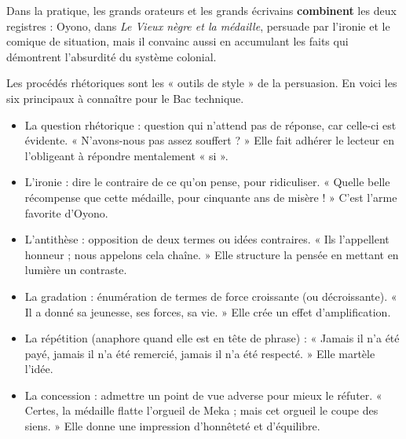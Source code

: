 \documentclass[11pt]{article}
\newcommand{\cle}[1]{{\popxbold\color{popdark}#1}}
\newcounter{popsec}
\newcounter{popsub}
\newcommand{\courssub}[1]{%
  \stepcounter{popsub}%
  \par\vspace{9pt}\noindent{\popxbold\fontsize{11.5}{13}\selectfont\color{popink}{\color{poporange}\thepopsec.\thepopsub}\hspace{6pt}#1}\par\nopagebreak\vspace{4pt}
}
\begin{document}
Dans la pratique, les grands orateurs et les grands écrivains \textbf{combinent} les deux registres : Oyono, dans \emph{Le Vieux nègre et la médaille}, persuade par l'ironie et le comique de situation, mais il convainc aussi en accumulant les faits qui démontrent l'absurdité du système colonial.

\courssub{Les procédés rhétoriques}

Les procédés rhétoriques sont les « outils de style » de la persuasion. En voici les six principaux à connaître pour le Bac technique.

\begin{definition}
\begin{itemize}
\item La \cle{question rhétorique} : question qui n'attend pas de réponse, car celle-ci est évidente. « N'avons-nous pas assez souffert ? » Elle fait adhérer le lecteur en l'obligeant à répondre mentalement « si ».
\item L'\cle{ironie} : dire le contraire de ce qu'on pense, pour ridiculiser. « Quelle belle récompense que cette médaille, pour cinquante ans de misère ! » C'est l'arme favorite d'Oyono.
\item L'\cle{antithèse} : opposition de deux termes ou idées contraires. « Ils l'appellent honneur ; nous appelons cela chaîne. » Elle structure la pensée en mettant en lumière un contraste.
\item La \cle{gradation} : énumération de termes de force croissante (ou décroissante). « Il a donné sa jeunesse, ses forces, sa vie. » Elle crée un effet d'amplification.
\item La \cle{répétition} (anaphore quand elle est en tête de phrase) : « Jamais il n'a été payé, jamais il n'a été remercié, jamais il n'a été respecté. » Elle martèle l'idée.
\item La \cle{concession} : admettre un point de vue adverse pour mieux le réfuter. « Certes, la médaille flatte l'orgueil de Meka ; mais cet orgueil le coupe des siens. » Elle donne une impression d'honnêteté et d'équilibre.
\end{itemize}
\end{definition}
\end{document}
